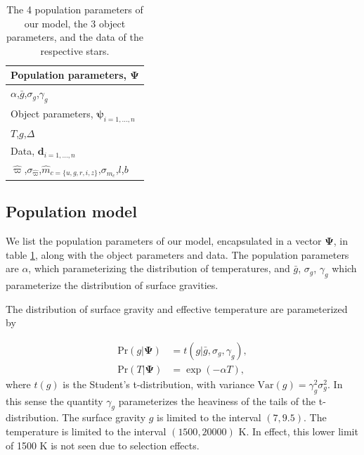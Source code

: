 \documentclass[fleqn,usenatbib]{mnras}
\newcommand{\popp}{\boldsymbol{\Psi}}
\newcommand{\objp}{\boldsymbol{\psi}}
\newcommand{\data}{\mathbf{d}}
\newcommand{\Teff}{T}
\newcommand{\logg}{g}
\newcommand{\pr}{\text{Pr}}
\begin{document}
\begin{table}
	\centering
	\caption{The 4 population parameters of our model, the 3 object parameters, and the data of the respective stars.}
	\label{tab:parameters}
    \begin{tabular}{l}
		\hline
		Population parameters, $\popp$ \\
		\hline
		$\alpha$,\quad $\bar{g}$,\quad $\sigma_g$,\quad $\gamma_g$ \\
        \hline
        Object parameters, $\objp_{i=1,...,n}$ \\
        \hline
        $\Teff$,\quad $\logg$,\quad $\Delta$ \\
        \hline
        Data, $\data_{i=1,...,n}$ \\
        \hline
        $\hat{\varpi}$,\quad $\sigma_{\hat{\varpi}}$,\quad $\hat{m}_{c=\{u,g,r,i,z\}}$,\quad $\sigma_{\hat{m}_c}$,\quad $l$,\quad $b$ \\
		\hline
	\end{tabular}
\end{table}

\subsection{Population model}\label{sec:populationmodel}

We list the population parameters of our model, encapsulated in a vector $\popp$, in table \ref{tab:parameters}, along with the object parameters and data. The population parameters are $\alpha$, which parameterizing the distribution of temperatures, and $\bar{g}$, $\sigma_g$, $\gamma_g$ which parameterize the distribution of surface gravities.

The distribution of surface gravity and effective temperature are parameterized by

\begin{equation}\label{eq:T&g}
\begin{split}
	\pr(\logg | \popp) & = t(\logg|\bar{g},\sigma_g,\gamma_g),\\
    \pr(\Teff | \popp) & = \exp (-\alpha \Teff),
\end{split}
\end{equation}
where $t(\logg)$ is the Student's t-distribution, with variance $\text{Var}(g) = \gamma_g^2 \sigma_g^2$. In this sense the quantity $\gamma_g$ parameterizes the heaviness of the tails of the t-distribution. The surface gravity $\logg$ is limited to the interval $(7,9.5)$. The temperature is limited to the interval $(1500,20000)$ K. In effect, this lower limit of 1500 K is not seen due to selection effects.
\end{document}
